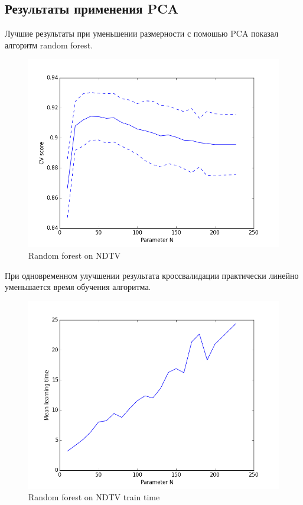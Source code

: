  \subsection*{Результаты применения PCA}
 Лучшие результаты при уменьшении размерности с помошью PCA показал алгоритм random forest.
 \begin{figure} \centering \includegraphics[width=1\textwidth]{images/randforest_NDTV_PCA.png} \caption{Random forest on NDTV } \label{fig:image} \end{figure}
 При одновременном улучшении результата кроссвалидации практически линейно уменьшается время обучения алгоритма.
  \begin{figure} \centering \includegraphics[width=1\textwidth]{images/randforest_NDTV_PCA_time.png} \caption{Random forest on NDTV train time} \label{fig:image} \end{figure}
